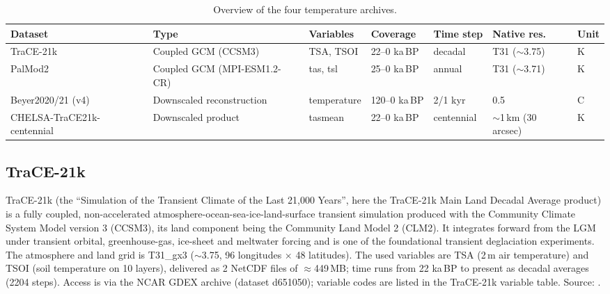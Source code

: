 \documentclass{isprs} %
\newcommand{\dg}{\textdegree}
\newcommand{\degC}{\textdegree C}
\newcommand{\kaBP}{ka\,BP}
\begin{document}
\begin{table}[t]
\centering
\small
\begin{tabular}{lllllll}
\toprule
Dataset           & Type                        & Variables   & Coverage     & Time step  & Native res.           & Unit \\
\midrule
TraCE-21k         & Coupled GCM (CCSM3)         & TSA, TSOI   & 22--0 \kaBP  & decadal    & T31 ($\sim$3.75\dg)   & K \\
PalMod2           & Coupled GCM (MPI-ESM1.2-CR) & tas, tsl    & 25--0 \kaBP  & annual     & T31 ($\sim$3.71\dg)   & K \\
Beyer2020/21 (v4) & Downscaled reconstruction   & temperature & 120--0 \kaBP & 2/1 kyr    & 0.5\dg{}              & \degC \\
CHELSA-TraCE21k-centennial   & Downscaled product          & tasmean     & 22--0 \kaBP  & centennial & $\sim$1\,km (30\,arcsec) & K \\
\bottomrule
\end{tabular}
\caption{Overview of the four temperature archives.}
\label{tab:overview}
\end{table}

\subsection{TraCE-21k}
TraCE-21k (the ``Simulation of the Transient Climate of the Last 21,000 Years'', here the TraCE-21k Main Land Decadal Average product) is a fully coupled, non-accelerated atmosphere-ocean-sea-ice-land-surface transient simulation produced with the Community Climate System Model version 3 (CCSM3), its land component being the Community Land Model 2 (CLM2). It integrates forward from the LGM under transient orbital, greenhouse-gas, ice-sheet and meltwater forcing and is one of the foundational transient deglaciation experiments. The atmosphere and land grid is T31\_gx3 ($\sim$3.75\dg, 96 longitudes $\times$ 48 latitudes). The used variables are TSA (2\,m air temperature) and TSOI (soil temperature on 10 layers), delivered as 2 NetCDF files of $\approx$449\,MB; time runs from 22 \kaBP{} to present as decadal averages (2204 steps). Access is via the NCAR GDEX archive (dataset d651050); variable codes are listed in the TraCE-21k variable table. Source: \cite{trace21k_data} \cite{trace_vars}.
\end{document}

